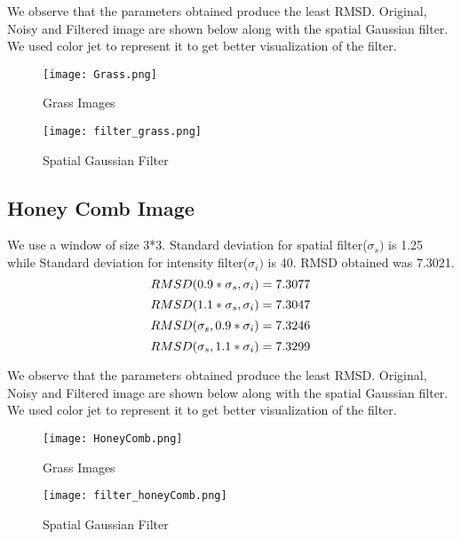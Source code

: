 \documentclass[12pt, a4paper]{article}
\begin{document}
We observe that the parameters obtained produce the least RMSD. Original, Noisy and Filtered image are shown below along with the spatial Gaussian filter. We used color jet to represent it to get better visualization of the filter.
\begin{figure}[h!]
  \centering
    \texttt{[image: Grass.png]}
    \caption{Grass Images}
  \label{fig:1}
\end{figure}

\begin{figure}[h!]
  \centering
    \texttt{[image: filter\_grass.png]}
    \caption{Spatial Gaussian Filter}
  \label{fig:2}
\end{figure}

\clearpage

\subsection*{Honey Comb Image}
We use a window of size 3*3. Standard deviation for spatial filter($\sigma_s)$ is 1.25 while Standard deviation for intensity filter($\sigma_i)$ is 40. RMSD obtained was 7.3021.
\begin{equation*}
    RMSD(0.9*\sigma_s, \sigma_i) = 7.3077\\
\end{equation*}
\begin{equation*}
    RMSD(1.1*\sigma_s, \sigma_i) = 7.3047\\
\end{equation*}
\begin{equation*}
    RMSD(\sigma_s, 0.9*\sigma_i) = 7.3246\\
\end{equation*}
\begin{equation*}
    RMSD(\sigma_s, 1.1*\sigma_i) = 7.3299\\
\end{equation*}

We observe that the parameters obtained produce the least RMSD. Original, Noisy and Filtered image are shown below along with the spatial Gaussian filter. We used color jet to represent it to get better visualization of the filter.
\begin{figure}[h!]
  \centering
    \texttt{[image: HoneyComb.png]}
    \caption{Grass Images}
  \label{fig:1}
\end{figure}

\begin{figure}[h!]
  \centering
    \texttt{[image: filter\_honeyComb.png]}
    \caption{Spatial Gaussian Filter}
  \label{fig:3}
\end{figure}
\end{document}
